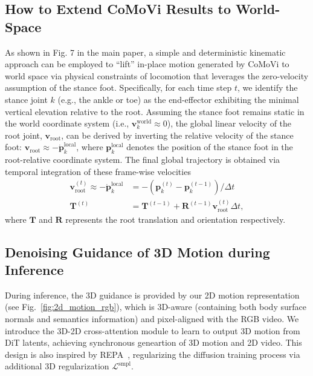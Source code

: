 \subsection{How to Extend CoMoVi Results to World-Space}
As shown in Fig. 7 in the main paper, a simple and deterministic kinematic approach can be employed to ``lift'' in-place motion generated by CoMoVi to world space via physical constraints of locomotion that leverages the zero-velocity assumption of the stance foot. Specifically, for each time step $t$, we identify the stance joint $k$ (e.g., the ankle or toe) as the end-effector exhibiting the minimal vertical elevation relative to the root. Assuming the stance foot remains static in the world coordinate system (i.e., $\mathbf{v}_{k}^{\text{world}} \approx 0$), the global linear velocity of the root joint, $\mathbf{v}_{\text{root}}$, can be derived by inverting the relative velocity of the stance foot: $\mathbf{v}_{\text{root}} \approx - \dot{\mathbf{p}}_{k}^{\text{local}}$, where $\mathbf{p}_{k}^{\text{local}}$ denotes the position of the stance foot in the root-relative coordinate system. The final global trajectory is obtained via temporal integration of these frame-wise velocities
\begin{equation}
\begin{aligned}
    \mathbf{v}_{\text{root}}^{(t)} \approx - \dot{\mathbf{p}}_{k}^{\text{local}} &= - \left( \mathbf{p}_{k}^{(t)} - \mathbf{p}_{k}^{(t-1)} \right) / \Delta t\\
    \mathbf{T}^{(t)} &= \mathbf{T}^{(t-1)} + \mathbf{R}^{(t-1)} \mathbf{v}_{\text{root}}^{(t)} \Delta t,
\end{aligned}
\end{equation}
where $\mathbf{T}$ and $\mathbf{R}$ represents the root translation and orientation respectively.

\subsection{Denoising Guidance of 3D Motion during Inference}
During inference, the 3D guidance is provided by our 2D motion representation (see Fig.~\ref{fig:2d_motion_rgb}), which is 3D-aware (containing both body surface normals and semantics information) and pixel-aligned with the RGB video. We introduce the 3D-2D cross-attention module to learn to output 3D motion from DiT latents, achieving synchronous geneartion of 3D motion and 2D video. This design is also inspired by REPA~\cite{yu2024repa}, regularizing the diffusion training process via additional 3D regularization $\mathcal{L}^{\text{smpl}}$.

